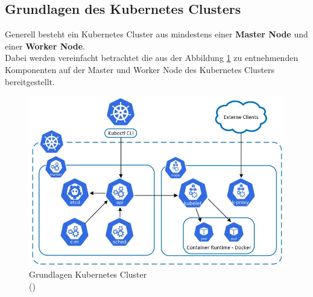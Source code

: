 \subsection{Grundlagen des Kubernetes Clusters}
\label{Grundlagen_Kubernetes}
Generell besteht ein Kubernetes Cluster aus mindestens einer \textbf{Master Node} und einer \textbf{Worker Node}.\\
Dabei werden vereinfacht betrachtet die aus der Abbildung \ref{Grafik_Grundlagen_Kubernetes_Cluster} zu entnehmenden Komponenten auf der Master und Worker Node des Kubernetes Clusters bereitgestellt.
\\
\begin{figure}[h]
	\begin{center}
		\includegraphics[width=16cm]{img/Kubernetes_Aufbau.JPG}
		\caption[Grundlagen Kubernetes Cluster]{Grundlagen Kubernetes Cluster \\
			(\cite[Eigene Abbildung in Anlehnung an][S.563]{Liebel.2019})}
		\label{Grafik_Grundlagen_Kubernetes_Cluster}
	\end{center}
\end{figure}
\\
\newpage
